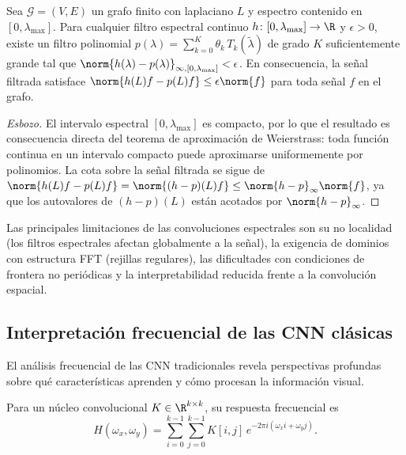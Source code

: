 \begin{theorem}
\label{thm:grids:spectral-universal}
Sea $\mathcal{G} = (V, E)$ un grafo finito con laplaciano $L$ y espectro
contenido en $[0, \lambda_{\max}]$. Para cualquier filtro espectral continuo
$h \colon [0, \lambda_{\max}] \to \R$ y $\epsilon > 0$, existe un filtro
polinomial $p(\lambda) = \sum_{k=0}^{K} \theta_k\, T_k(\tilde{\lambda})$ de grado
$K$ suficientemente grande tal que
$\norm{h(\lambda) - p(\lambda)}_{\infty, [0, \lambda_{\max}]} < \epsilon$. En
consecuencia, la se\~nal filtrada satisface $\norm{h(L)f - p(L)f} \leq
\epsilon \norm{f}$ para toda se\~nal $f$ en el grafo.
\end{theorem}

\begin{proof}[Esbozo]
El intervalo espectral $[0, \lambda_{\max}]$ es compacto, por lo que el
resultado es consecuencia directa del teorema de aproximaci\'on de Weierstrass:
toda funci\'on continua en un intervalo compacto puede aproximarse uniformemente
por polinomios. La cota sobre la se\~nal filtrada se sigue de
$\norm{h(L)f - p(L)f} = \norm{(h-p)(L)f} \leq \norm{h - p}_\infty \norm{f}$, ya
que los autovalores de $(h-p)(L)$ est\'an acotados por $\norm{h-p}_\infty$.
\end{proof}

Las principales limitaciones de las convoluciones espectrales son su no
localidad (los filtros espectrales afectan globalmente a la se\~nal), la
exigencia de dominios con estructura FFT (rejillas regulares), las dificultades
con condiciones de frontera no peri\'odicas y la interpretabilidad reducida
frente a la convoluci\'on espacial.

\subsection{Interpretaci\'on frecuencial de las CNN cl\'asicas}
\label{sec:grids:freq-interpretation}

El an\'alisis frecuencial de las CNN tradicionales revela perspectivas profundas
sobre qu\'e caracter\'isticas aprenden y c\'omo procesan la informaci\'on
visual.

\begin{definition}
\label{def:grids:freq-response}
Para un n\'ucleo convolucional $K \in \R^{k \times k}$, su respuesta frecuencial
es
\[
  H(\omega_x, \omega_y) = \sum_{i=0}^{k-1} \sum_{j=0}^{k-1} K[i,j]\,
    e^{-2\pi i(\omega_x i + \omega_y j)}.
\]
\end{definition}

